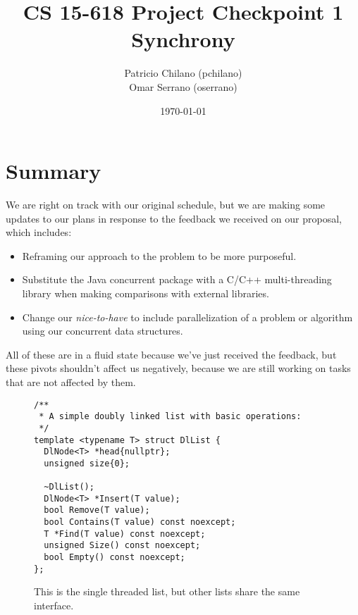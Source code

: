 \documentclass[11pt]{article}
\title{\vspace{-25pt}
\huge CS 15-618 Project Checkpoint 1 \\
\huge Synchrony
}
\author{
    Patricio Chilano (pchilano) \\
    Omar Serrano (oserrano)
}
\date{\today}
\begin{document}


\maketitle

\section*{Summary}
We are right on track with our original schedule, but we are making some updates to 
our plans in response to the feedback we received on our proposal, which includes:

\begin{itemize}
\item
Reframing our approach to the problem to be more purposeful.
\item
Substitute the Java concurrent package with a C/C++ multi-threading library when making comparisons with external libraries.
\item
Change our {\it nice-to-have} to include parallelization of a problem or algorithm using
our concurrent data structures.
\end{itemize}

All of these are in a fluid state because we've just received the feedback, but
these pivots shouldn't affect us negatively, because we are still working on
tasks that are not affected by them.

\begin{figure}
\begin{center}
\begin{lstlisting}
/**
 * A simple doubly linked list with basic operations:
 */
template <typename T> struct DlList {
  DlNode<T> *head{nullptr};
  unsigned size{0};

  ~DlList();
  DlNode<T> *Insert(T value);
  bool Remove(T value);
  bool Contains(T value) const noexcept;
  T *Find(T value) const noexcept;
  unsigned Size() const noexcept;
  bool Empty() const noexcept;
};
\end{lstlisting}
\caption{
This is the single threaded list, but other lists share the same interface.}
\label{fig:dllist}
\end{center}
\end{figure}
\end{document}
